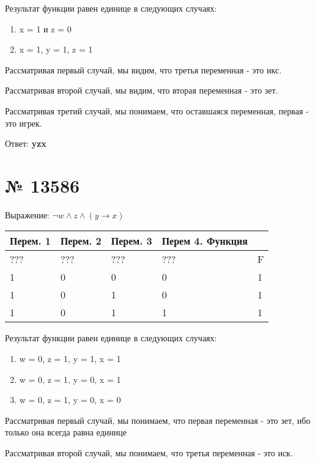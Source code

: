 \documentclass[11pt]{article} %
\begin{document}
\vspace{2mm}

Результат функции равен единице в следующих случаях:

\begin{enumerate}
	\item x = 1 и z = 0
	\item x = 1, y = 1, z = 1
\end{enumerate}

Рассматривая первый случай, мы видим, что третья переменная - это икс.

Рассматривая второй случай, мы видим, что вторая переменная - это зет.

Рассматривая третий случай, мы понимаем, что оставшаяся переменная, первая - это игрек.

Ответ: \textbf{yzx}

\section{№ \textbf{13586}}

Выражение: $\lnot{w} \land z \land (y \rightarrow x)$

\vspace{2mm}
\begin{tabular}{ | l | l | l | l | l | }
\hline
Перем. 1 & Перем. 2 & Перем. 3 & Перем 4. Функция \\ \hline
??? & ??? & ??? & ??? & F \\ \hline
1 & 0 & 0 & 0 & 1 \\ \hline
1 & 0 & 1 & 0 & 1 \\ \hline
1 & 0 & 1 & 1 & 1 \\ \hline
\end{tabular}

\vspace{2mm}

Результат функции равен единице в следующих случаях:

\begin{enumerate}
	\item w = 0, z = 1, y = 1, x = 1
	\item w = 0, z = 1, y = 0, x = 1
	\item w = 0, z = 1, y = 0, x = 0
\end{enumerate}

Рассматривая первый случай, мы понимаем, что первая переменная - это зет, ибо только она всегда равна единице

Рассматривая второй случай, мы понимаем, что третья переменная - это иск.
\end{document}
